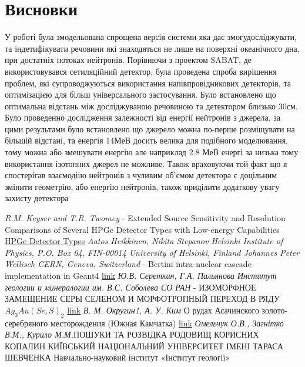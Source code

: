 \documentclass[a4paper, 14pt]{article}
\numberwithin{equation}{section}
\numberwithin{table}{section}
\begin{document}
\newpage 
\section{Висновки}
\setcounter{figure}{0}
У роботі була змодельована спрощена версія системи яка дає змогудосліджувати, та індетифікувати речовини які знаходяться не лише на поверхні океанічного дна, при достатніх потоках нейтронів. Порівнючи з проектом SABAT, де використовувався сетиляційний детектор, була проведена спроба вирішення проблем, які супроводжуються використання напівпровідникових детекторів, та оптимізацією для більш універсального застосування. 
Було встановлено що оптимальна відстань між досліджуваною речовиною та детектором близько 30см. Було проведенно дослідження залежності від енергії нейтронів з джерела, за цими результами було встановлено що джерело можна по-перше розміщувати на більшій відстані, та енергія 14МеВ досить велика для подібного моделювання, тому можна або змешувати енергію але наприклад 2.8 МеВ енергі за низька тому використання ізотопних джерел не можливе. Також враховуючи той факт що я спостерігав взаємодіію нейтронів з чуливим об'ємом детектора є доцільним змінити геометрію, або енергію нейтронів, також приділити додаткову увагу захисту детектора 

\newpage	
\begin{thebibliography}{}
	
	 \textit{R.M. Keyser and T.R. Twomey} - Extended Source Sensitivity and Resolution Comparisons of Several HPGe Detector Types with Low-energy Capabilities \\
	\href{https://www.ortec-online.com/-/media/ametekortec/technical%20papers/high%20purity%20germanium%20detector%20applications%20and%20technology%20developements/extended-source-sensitivity-resolution-comparisons-several-hpge-detector-types-low-energy-capabilities.pdf?la=en}{ HPGe Detector Types}		
	 \textit{Aatos Heikkinen, Nikita Stepanov Helsinki Institute of Physics, P.O. Box 64, FIN-00014 University of Helsinki, Finland Johannes Peter Wellisch CERN, Geneva, Switzerland} - Bertini intra-nuclear cascade implementation in Geant4
	\href{https://www.slac.stanford.edu/econf/C0303241/proc/papers/MOMT008.PDF}{link}	
	 \textit{Ю.В. Сереткин, Г.А. Пальянова Институт геологии и минералогии им. В.С. Соболева СО РАН} - ИЗОМОРФНОЕ ЗАМЕЩЕНИЕ СЕРЫ СЕЛЕНОМ И МОРФОТРОПНЫЙ ПЕРЕХОД В РЯДУ $Ag_3Au(Se,S)_2$
	\href{https://www.sibran.ru/upload/iblock/478/478309021b63c0dc426e82c4025e6471.pdf}{link}	
	 \textit{В. М. Округин1, А. У. Ким} О рудах Асачинского золото-серебряного месторождения
	(Южная Камчатка)
	\href{http://www.kscnet.ru/ivs/publication/volc_day/2014/art51.pdf}{link}	
	 \textit{Омельчук О.В., Загнітко В.М., Курило М.М.}ПОШУКИ ТА РОЗВІДКА РОДОВИЩ КОРИСНИХ КОПАЛИН КИЇВСЬКИЙ НАЦІОНАЛЬНИЙ УНІВЕРСИТЕТ ІМЕНІ ТАРАСА ШЕВЧЕНКА Навчально-науковий інститут «Інститут геології»
	
\end{thebibliography}
\end{document}
